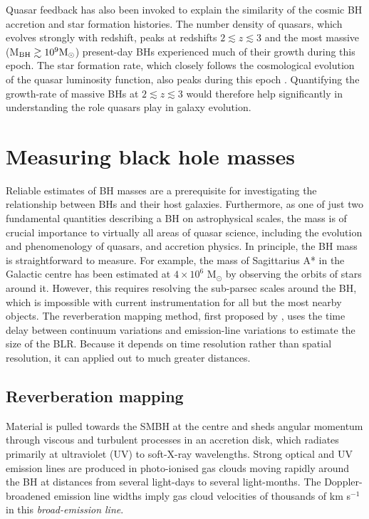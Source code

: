 Quasar feedback has also been invoked to explain the similarity of the cosmic BH accretion and star formation histories.
The number density of quasars, which evolves strongly with redshift, peaks at redshifts $2 \lesssim z \lesssim 3$ \citep[e.g.][]{brandt05,richards06b} and the most massive (M$_{\rm BH} \gtrsim 10^9{{{\rm M_\odot}}}$) present-day BHs experienced much of their growth during this epoch.  
The star formation rate, which closely follows the cosmological evolution of the quasar luminosity function, also peaks during this epoch \citep[e.g.][]{boyle98}. 
Quantifying the growth-rate of massive BHs at $2 \lesssim z \lesssim 3$ would therefore help significantly in understanding the role quasars play in galaxy evolution.

\section{Measuring black hole masses}

Reliable estimates of BH masses are a prerequisite for investigating the relationship between BHs and their host galaxies.  
Furthermore, as one of just two fundamental quantities describing a BH on astrophysical scales, the mass is of crucial importance to virtually all areas of quasar science, including the evolution and phenomenology of quasars, and accretion physics. 
In principle, the BH mass is straightforward to measure. 
For example, the mass of Sagittarius A* in the Galactic centre has been estimated at $4\times10^6$ M$_\odot$ by observing the orbits of stars around it. 
However, this requires resolving the sub-parsec scales around the BH, which is impossible with current instrumentation for all but the most nearby objects.
The reverberation mapping method, first proposed by \citet{blanford82}, uses the time delay between continuum variations and emission-line variations to estimate the size of the BLR. 
Because it depends on time resolution rather than spatial resolution, it can applied out to much greater distances. 

\subsection{Reverberation mapping}

Material is pulled towards the SMBH at the centre and sheds angular momentum through viscous and turbulent processes in an accretion disk, which radiates primarily at ultraviolet (UV) to soft-X-ray wavelengths. 
Strong optical and UV emission lines are produced in photo-ionised gas clouds moving rapidly around the BH at distances from several light-days to several light-months.
The Doppler-broadened emission line widths imply gas cloud velocities of thousands of km s$^{-1}$ in this {\it broad-emission line}. 

